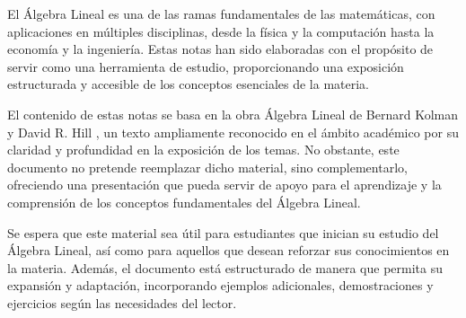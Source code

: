El Álgebra Lineal es una de las ramas fundamentales de las matemáticas, con aplicaciones en múltiples disciplinas, desde la física y la computación hasta la economía y la ingeniería. Estas notas han sido elaboradas con el propósito de servir como una herramienta de estudio, proporcionando una exposición estructurada y accesible de los conceptos esenciales de la materia.

El contenido de estas notas se basa en la obra Álgebra Lineal de Bernard Kolman y David R. Hill \citep{kolman2006algebra}, un texto ampliamente reconocido en el ámbito académico por su claridad y profundidad en la exposición de los temas. No obstante, este documento no pretende reemplazar dicho material, sino complementarlo, ofreciendo una presentación que pueda servir de apoyo para el aprendizaje y la comprensión de los conceptos fundamentales del Álgebra Lineal.

Se espera que este material sea útil para estudiantes que inician su estudio del Álgebra Lineal, así como para aquellos que desean reforzar sus conocimientos en la materia. Además, el documento está estructurado de manera que permita su expansión y adaptación, incorporando ejemplos adicionales, demostraciones y ejercicios según las necesidades del lector.
